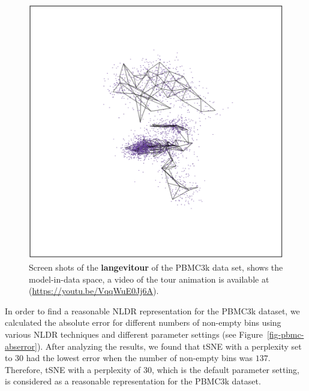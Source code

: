 \documentclass[
  12pt]{article}
\begin{document}
\begin{figure}[H]
%
\begin{minipage}{0.33\linewidth}
\includegraphics{figures/pbmc3k/sc_3.png}\end{minipage}%

\caption{\label{fig-pbmc1_sc}Screen shots of the \textbf{langevitour} of
the PBMC3k data set, shows the model-in-data space, a video of the tour
animation is available at (\url{https://youtu.be/VqqWuE0Jj6A}).}

\end{figure}%

In order to find a reasonable NLDR representation for the PBMC3k
dataset, we calculated the absolute error for different numbers of
non-empty bins using various NLDR techniques and different parameter
settings (see Figure~\ref{fig-pbmc-abserror}). After analyzing the
results, we found that tSNE with a perplexity set to \(30\) had the
lowest error when the number of non-empty bins was \(137\). Therefore,
tSNE with a perplexity of \(30\), which is the default parameter
setting, is considered as a reasonable representation for the PBMC3k
dataset.
\end{document}
